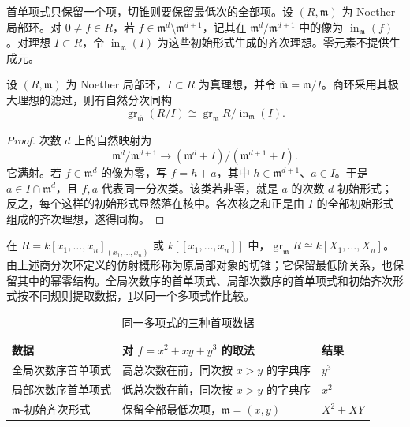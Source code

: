 首单项式只保留一个项，切锥则要保留最低次的全部项。设 \((R,\mathfrak m)\) 为 Noether 局部环。对 \(0\ne f\in R\)，若 \(f\in\mathfrak m^d\setminus\mathfrak m^{d+1}\)，记其在 \(\mathfrak m^d/\mathfrak m^{d+1}\) 中的像为 \(\operatorname{in}_{\mathfrak m}(f)\)。对理想 \(I\subset R\)，令 \(\operatorname{in}_{\mathfrak m}(I)\) 为这些初始形式生成的齐次理想。零元素不提供生成元。

\begin{proposition}\label{b3:prop:F-associated-quotient}
	设 \((R,\mathfrak m)\) 为 Noether 局部环，\(I\subset R\) 为真理想，并令 \(\overline{\mathfrak m}=\mathfrak m/I\)。商环采用其极大理想的滤过，则有自然分次同构
	\[
		\operatorname{gr}_{\overline{\mathfrak m}}(R/I) \cong \operatorname{gr}_{\mathfrak m}R/ \operatorname{in}_{\mathfrak m}(I).
	\]
\end{proposition}
\begin{proof}
	次数 \(d\) 上的自然映射为
	\[
		\mathfrak m^d/\mathfrak m^{d+1} \longrightarrow (\mathfrak m^d+I)/(\mathfrak m^{d+1}+I).
	\]
	它满射。若 \(f\in\mathfrak m^d\) 的像为零，写 \(f=h+a\)，其中 \(h\in\mathfrak m^{d+1}\)、\(a\in I\)。于是 \(a\in I\cap\mathfrak m^d\)，且 \(f,a\) 代表同一分次类。该类若非零，就是 \(a\) 的次数 \(d\) 初始形式；反之，每个这样的初始形式显然落在核中。各次核之和正是由 \(I\) 的全部初始形式组成的齐次理想，遂得同构。
\end{proof}

在 \(R=k[x_1,\ldots,x_n]_{(x_1,\ldots,x_n)}\) 或 \(k[\![x_1,\ldots,x_n]\!]\) 中，\(\operatorname{gr}_{\mathfrak m}R\cong k[X_1,\ldots,X_n]\)。由上述商分次环定义的仿射概形称为原局部对象的切锥；它保留最低阶关系，也保留其中的幂零结构。全局次数序的首单项式、局部次数序的首单项式和初始齐次形式按不同规则提取数据，\cref{b3:tab:F-leading-initial-comparison}以同一个多项式作比较。

\begin{table}[htbp]
	\centering
	\caption{同一多项式的三种首项数据}
	\label{b3:tab:F-leading-initial-comparison}
	\begin{tabularx}{\textwidth}{@{}>{\raggedright\arraybackslash}p{}>{\raggedright\arraybackslash}X>{\raggedright\arraybackslash}p{}@{}}
		\toprule
		数据 & 对 \(f=x^2+xy+y^3\) 的取法 & 结果 \\
		\midrule
		全局次数序首单项式 & 高总次数在前，同次按 \(x>y\) 的字典序 & \(y^3\) \\
		局部次数序首单项式 & 低总次数在前，同次按 \(x>y\) 的字典序 & \(x^2\) \\
		\(\mathfrak m\)-初始齐次形式 & 保留全部最低次项，\(\mathfrak m=(x,y)\) & \(X^2+XY\) \\
		\bottomrule
	\end{tabularx}
\end{table}

